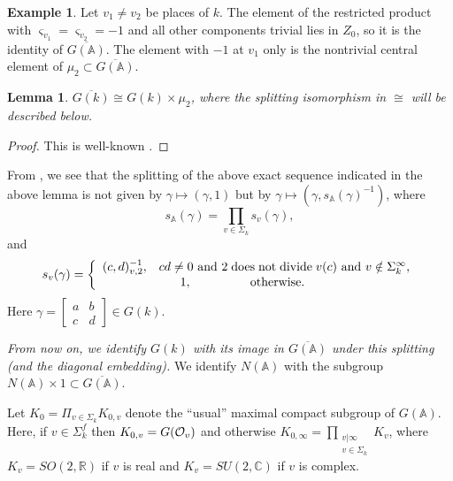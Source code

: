 \documentclass[12pt,letterpaper]{book}
\theoremstyle{plain}
\newtheorem{lemma}[theorem]{Lemma}
\theoremstyle{definition}
\newtheorem{example}[theorem]{Example}
\theoremstyle{remark}
\theoremstyle{remark}
\begin{document}
\begin{example}
Let $v_1\neq v_2$ be places of $k$. The element of the restricted
product with $\varsigma_{v_1}=\varsigma_{v_2}=-1$ and all other
components trivial lies in $Z_0$, so it is the identity of
$\overline{G({\mathbb{A}})}$. The element with $-1$ at $v_1$ only is the
nontrivial central element of $\mu_2\subset\overline{G({\mathbb{A}})}$.
\end{example}

\begin{lemma}\label{lem:Gk-split}
$\overline{G(k)}\cong G(k)\times \mu _2$,
where the splitting isomorphism in $\cong$ will be
described below.
\end{lemma}

\begin{proof} This is well-known \cite{K2}.
\end{proof}

From \cite{K2}, we see that
the splitting of the above exact sequence indicated in the above
lemma is not given by $\gamma \longmapsto (\gamma ,1)$ but by $\gamma
\longmapsto (\gamma ,s_{{\mathbb{A}}}(\gamma )^{-1})$, where
\[
s_{{\mathbb{A}}}(\gamma )=
\prod_{v\in \Sigma _k}
s_v(\gamma),
\]
and
\begin{equation}\label{eq:sv}
s_v(\gamma)=\left\{
\begin{array}{c}
(c,d)_{v,2}^{-1},
\;\;\;cd\neq 0{\rm \ and\ }
2\;\mathrm{does\;not\;divide}\;v(c)
{\rm \ and\ }v\notin \Sigma_k^\infty, \\
1,\;\;\;\;\;\;\;\;\;\;\;\;\;\;\;\;
\mathrm{\;otherwise}.\;\;\;\;\;\;\;\;
\end{array}
\right.
\end{equation}
Here $\gamma =\left[
\begin{array}{cc}
a & b \\
c & d
\end{array}
\right] \in G(k)$.

{\em From now on, we identify $G(k)$ with its image
in $\overline{G({\mathbb{A}})}$ under this splitting (and the diagonal
embedding).} We identify $N({\mathbb{A}})$ with the
subgroup $N({\mathbb{A}})\times 1\subset \overline{G({\mathbb{A}})}$.

Let $K_0=\Pi_{v\in \Sigma_k}K_{0,v}$
denote the ``usual'' maximal compact subgroup of $G({\mathbb{A}})$.
Here, if $v\in \Sigma_k^f $ then $K_{0,v}=G({\cal O}_v)$ and
otherwise
$K_{0,\infty}=\prod_{\substack{ v|\infty\\ v\in\Sigma_k}}
K_v$, where $K_v=SO(2,{\mathbb{R}})$ if $v$ is real and
$K_v=SU(2,{\mathbb{C}})$ if $v$ is complex.
\end{document}
